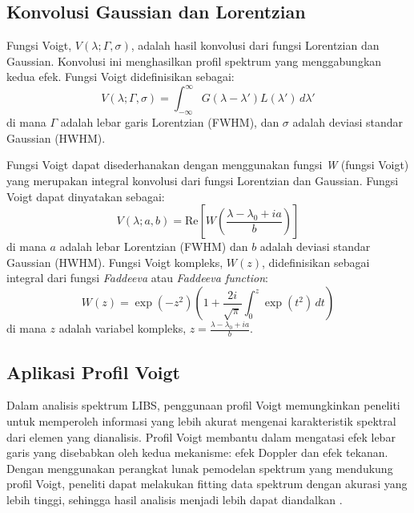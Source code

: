 \subsection{Konvolusi Gaussian dan Lorentzian}
\par Fungsi Voigt, \( V(\lambda; \Gamma, \sigma) \), adalah hasil konvolusi dari fungsi Lorentzian dan Gaussian. Konvolusi ini menghasilkan profil spektrum yang menggabungkan kedua efek. Fungsi Voigt didefinisikan sebagai:
\begin{equation}
V(\lambda; \Gamma, \sigma) = \int_{-\infty}^{\infty} G(\lambda - \lambda') L(\lambda') \, d\lambda'
\end{equation}
di mana \( \Gamma \) adalah lebar garis Lorentzian (FWHM), dan \( \sigma \) adalah deviasi standar Gaussian (HWHM).

\par Fungsi Voigt dapat disederhanakan dengan menggunakan fungsi \textit{W} (fungsi Voigt) yang merupakan integral konvolusi dari fungsi Lorentzian dan Gaussian. Fungsi Voigt dapat dinyatakan sebagai:
\begin{equation}
V(\lambda; a, b) = \text{Re} \left[ W\left(\frac{\lambda - \lambda_0 + i a}{b}\right) \right]
\end{equation}
di mana \( a \) adalah lebar Lorentzian (FWHM) dan \( b \) adalah deviasi standar Gaussian (HWHM). Fungsi Voigt kompleks, \( W(z) \), didefinisikan sebagai integral dari fungsi \textit{Faddeeva} atau \textit{Faddeeva function}:
\begin{equation}
W(z) = \exp(-z^2) \left(1 + \frac{2i}{\sqrt{\pi}} \int_{0}^{z} \exp(t^2) \, dt \right)
\end{equation}
di mana \( z \) adalah variabel kompleks, \( z = \frac{\lambda - \lambda_0 + i a}{b} \).

\subsection{Aplikasi Profil Voigt}
\par Dalam analisis spektrum LIBS, penggunaan profil Voigt memungkinkan peneliti untuk memperoleh informasi yang lebih akurat mengenai karakteristik spektral dari elemen yang dianalisis. Profil Voigt membantu dalam mengatasi efek lebar garis yang disebabkan oleh kedua mekanisme: efek Doppler dan efek tekanan. Dengan menggunakan perangkat lunak pemodelan spektrum yang mendukung profil Voigt, peneliti dapat melakukan fitting data spektrum dengan akurasi yang lebih tinggi, sehingga hasil analisis menjadi lebih dapat diandalkan \citep{jeong2002, smith2013}.
